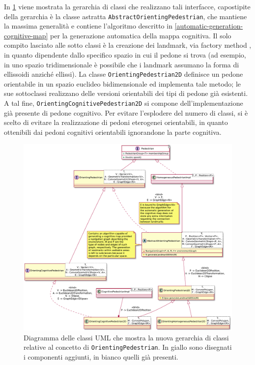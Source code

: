 \documentclass[12pt,a4paper,openright,oneside]{book}
\begin{document}
In \cref{fig:orienting-pedestrian-classes} viene mostrata la gerarchia di classi che realizzano tali interfacce, capostipite della gerarchia è la classe astratta \texttt{AbstractOrientingPedestrian}, che mantiene la massima generalità e contiene l'algoritmo descritto in \ref{automatic-generation-cognitive-map} per la generazione automatica della mappa cognitiva. Il solo compito lasciato alle sotto classi è la creazione dei landmark, via factory method \cite{GoFDesignPatterns}, in quanto dipendente dallo specifico spazio in cui il pedone si trova (ad esempio, in uno spazio tridimensionale è possibile che i landmark assumano la forma di ellissoidi anziché ellissi). La classe \texttt{OrientingPedestrian2D} definisce un pedone orientabile in un spazio euclideo bidimensionale ed implementa tale metodo; le sue sottoclassi realizzano delle versioni orientabili dei tipi di pedone già esistenti. A tal fine, \texttt{OrientingCognitivePedestrian2D} si compone dell'implementazione già presente di pedone cognitivo. Per evitare l'esplodere del numero di classi, si è scelto di evitare la realizzazione di pedoni eterogenei orientabili, in quanto ottenibili dai pedoni cognitivi orientabili ignorandone la parte cognitiva. 
\begin{figure}
	\centering
	\includegraphics[width=\linewidth]{figures/orienting-pedestrian-classes.pdf}
	\caption{Diagramma delle classi UML che mostra la nuova gerarchia di classi relative al concetto di \texttt{OrientingPedestrian}. In giallo sono disegnati i componenti aggiunti, in bianco quelli già presenti.}
	\label{fig:orienting-pedestrian-classes}
\end{figure}
\end{document}
